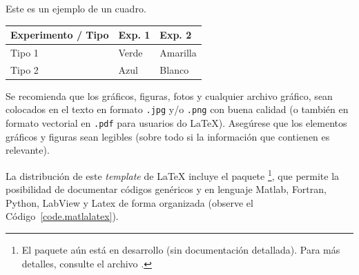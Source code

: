 \documentclass[12pt, a4paper, twoside, twocolumn]{article}
\begin{document}
\begin{quadro}[ht!]
  \centering {} \setlength\aboverulesep{0pt} \setlength\belowrulesep{0pt}
  \caption{Este es un ejemplo de un cuadro.}
	\fontsize{11}{12}\selectfont 
    \begin{tabular}{| C{2.8cm} | C{1.8cm} | C{1.8cm} |}
    \hline
    \textbf{ Experimento / Tipo } & \textbf{Exp. 1} & \textbf{Exp. 2}\\
	\midrule
		Tipo 1& Verde & Amarilla\\
		 Tipo 2 & Azul & Blanco\\
		\hline
    \end{tabular}
    \label{quad.exemplo}%
\end{quadro}%



Se recomienda que los gráficos, figuras, fotos y cualquier archivo gráfico, sean colocados en el texto en formato \!\texttt{.jpg} y/o \texttt{.png} con buena calidad (o también en formato vectorial en \texttt{.pdf} para usuarios do \LaTeX\xspace). Asegúrese que los elementos gráficos y figuras sean legibles (sobre todo si la información que contienen es relevante).

La distribución de este \textit{template} de \LaTeX\xspace incluye el paquete \footnote{El paquete aún está en desarrollo (sin documentación detallada). Para más detalles, consulte el archivo .}, que permite la posibilidad de documentar códigos genéricos y en lenguaje Matlab, Fortran, Python, LabView y Latex de forma organizada (observe el Código~\ref{code.matlalatex}).
\end{document}
